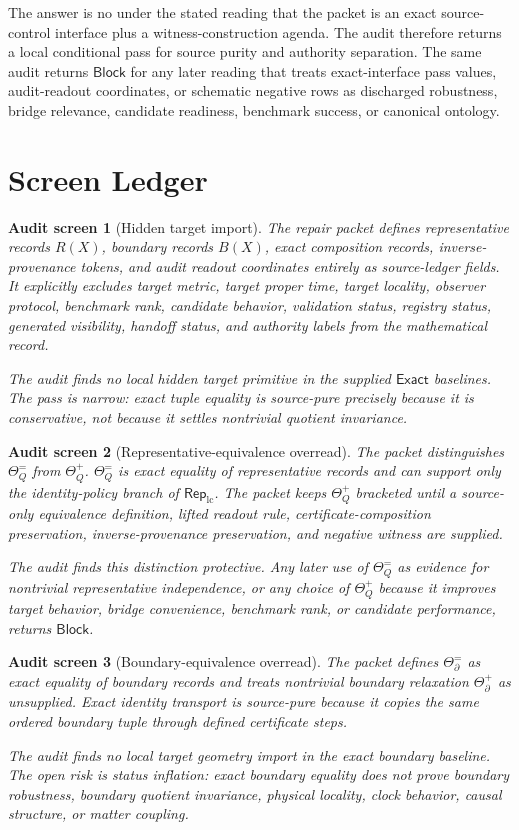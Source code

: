 \documentclass[11pt]{article}
\newcommand{\RepLC}{\mathsf{Rep}_{\mathrm{lc}}}
\newcommand{\Block}{\mathsf{Block}}
\newcommand{\Exact}{\mathsf{Exact}}
\newtheorem{screen}{Audit screen}
\begin{document}
The answer is no under the stated reading that the packet is an exact
source-control interface plus a witness-construction agenda. The audit
therefore returns a local conditional pass for source purity and
authority separation. The same audit returns \(\Block\) for any later
reading that treats exact-interface pass values, audit-readout
coordinates, or schematic negative rows as discharged robustness,
bridge relevance, candidate readiness, benchmark success, or canonical
ontology.

\section{Screen Ledger}

\begin{screen}[Hidden target import]
The repair packet defines representative records \(R(X)\), boundary
records \(B(X)\), exact composition records, inverse-provenance
tokens, and audit readout coordinates entirely as source-ledger fields.
It explicitly excludes target metric, target proper time, target
locality, observer protocol, benchmark rank, candidate behavior,
validation status, registry status, generated visibility, handoff
status, and authority labels from the mathematical record.

The audit finds no local hidden target primitive in the supplied
\(\Exact\) baselines. The pass is narrow: exact tuple equality is
source-pure precisely because it is conservative, not because it
settles nontrivial quotient invariance.
\end{screen}

\begin{screen}[Representative-equivalence overread]
The packet distinguishes \(\Theta_Q^{=}\) from \(\Theta_Q^{+}\).
\(\Theta_Q^{=}\) is exact equality of representative records and can
support only the identity-policy branch of \(\RepLC\). The packet
keeps \(\Theta_Q^{+}\) bracketed until a source-only equivalence
definition, lifted readout rule, certificate-composition preservation,
inverse-provenance preservation, and negative witness are supplied.

The audit finds this distinction protective. Any later use of
\(\Theta_Q^{=}\) as evidence for nontrivial representative
independence, or any choice of \(\Theta_Q^{+}\) because it improves
target behavior, bridge convenience, benchmark rank, or candidate
performance, returns \(\Block\).
\end{screen}

\begin{screen}[Boundary-equivalence overread]
The packet defines \(\Theta_{\partial}^{=}\) as exact equality of
boundary records and treats nontrivial boundary relaxation
\(\Theta_{\partial}^{+}\) as unsupplied. Exact identity transport is
source-pure because it copies the same ordered boundary tuple through
defined certificate steps.

The audit finds no local target geometry import in the exact boundary
baseline. The open risk is status inflation: exact boundary equality
does not prove boundary robustness, boundary quotient invariance,
physical locality, clock behavior, causal structure, or matter
coupling.
\end{screen}
\end{document}
